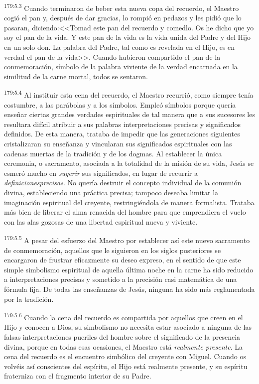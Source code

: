 \par 
\textsuperscript{179:5.3} Cuando terminaron de beber esta nueva copa del recuerdo, el Maestro cogió el pan y, después de dar gracias, lo rompió en pedazos y les pidió que lo pasaran, diciendo:<<Tomad este pan del recuerdo y comedlo. Os he dicho que yo soy el pan de la vida. Y este pan de la vida es la vida unida del Padre y del Hijo en un solo don. La palabra del Padre, tal como es revelada en el Hijo, es en verdad el pan de la vida>>. Cuando hubieron compartido el pan de la conmemoración, símbolo de la palabra viviente de la verdad encarnada en la similitud de la carne mortal, todos se sentaron.

\par 
\textsuperscript{179:5.4} Al instituir esta cena del recuerdo, el Maestro recurrió, como siempre tenía costumbre, a las parábolas y a los símbolos. Empleó símbolos porque quería enseñar ciertas grandes verdades espirituales de tal manera que a sus sucesores les resultara difícil atribuir a sus palabras interpretaciones precisas y significados definidos. De esta manera, trataba de impedir que las generaciones siguientes cristalizaran su enseñanza y vincularan sus significados espirituales con las cadenas muertas de la tradición y de los dogmas. Al establecer la única ceremonia, o sacramento, asociada a la totalidad de la misión de su vida, Jesús se esmeró mucho en \textit{sugerir} sus significados, en lugar de recurrir a \textit{definicionesprecisas}. No quería destruir el concepto individual de la comunión divina, estableciendo una práctica precisa; tampoco deseaba limitar la imaginación espiritual del creyente, restringiéndola de manera formalista. Trataba más bien de liberar el alma renacida del hombre para que emprendiera el vuelo con las alas gozosas de una libertad espiritual nueva y viviente.

\par 
\textsuperscript{179:5.5} A pesar del esfuerzo del Maestro por establecer así este nuevo sacramento de conmemoración, aquellos que le siguieron en los siglos posteriores se encargaron de frustrar eficazmente su deseo expreso, en el sentido de que este simple simbolismo espiritual de aquella última noche en la carne ha sido reducido a interpretaciones precisas y sometido a la precisión casi matemática de una fórmula fija. De todas las enseñanzas de Jesús, ninguna ha sido más reglamentada por la tradición.

\par 
\textsuperscript{179:5.6} Cuando la cena del recuerdo es compartida por aquellos que creen en el Hijo y conocen a Dios, su simbolismo no necesita estar asociado a ninguna de las falsas interpretaciones pueriles del hombre sobre el significado de la presencia divina, porque en todas esas ocasiones, el Maestro está \textit{realmente presente}. La cena del recuerdo es el encuentro simbólico del creyente con Miguel. Cuando os volvéis así conscientes del espíritu, el Hijo está realmente presente, y su espíritu fraterniza con el fragmento interior de su Padre.

